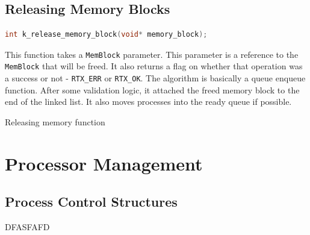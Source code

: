 \documentclass[12pt]{report}
\begin{document}
\subsection{Releasing Memory Blocks}

\begin{minipage}{\textwidth}
\begin{lstlisting}[language=C, frame=single]
int k_release_memory_block(void* memory_block);
\end{lstlisting}
\end{minipage}

This function takes a \texttt{MemBlock} parameter. This parameter is a reference to the \texttt{MemBlock} that will be freed. It also returns a flag on whether that operation was a success or not - \texttt{RTX_ERR} or \texttt{RTX_OK}. The algorithm is basically a queue enqueue function. After some validation logic, it attached the freed memory block to the end of the linked list. It also moves processes into the ready queue if possible.

\begin{algorithm}
  \caption{Releasing memory function}
  \begin{algorithmic}[1]
	  \EndIf
	  \EndIf
	  \EndIf
	  \EndIf
    \EndProcedure
  \end{algorithmic}
\end{algorithm}

\pagebreak



\section{Processor Management}

\subsection{Process Control Structures}
DFASFAFD
\end{document}
